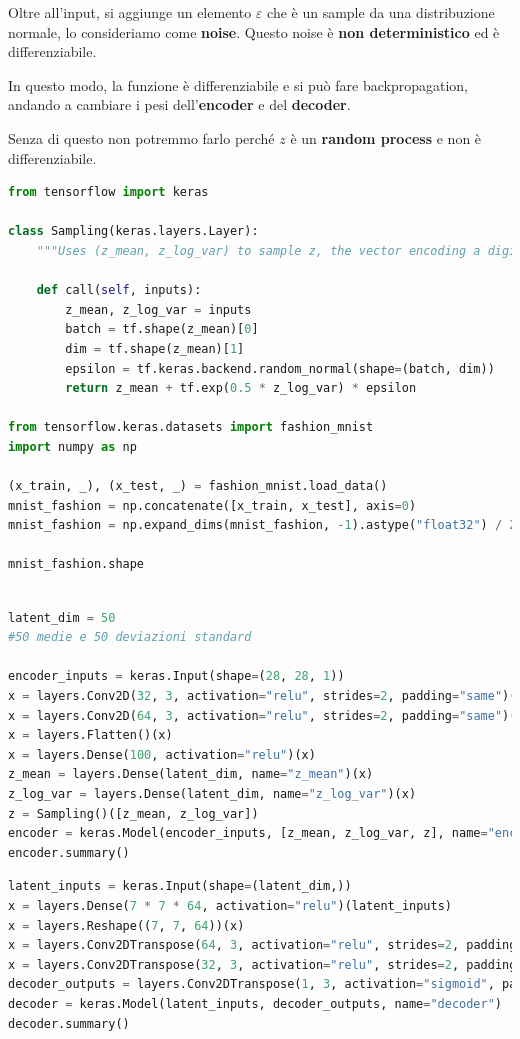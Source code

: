 Oltre all'input, si aggiunge un elemento $\varepsilon$ che è un sample da una
distribuzione normale, lo consideriamo come \textbf{noise}. Questo noise è
\textbf{non deterministico} ed è differenziabile.

In questo modo, la funzione è differenziabile e si può fare backpropagation,
andando a cambiare i pesi dell'\textbf{encoder} e del \textbf{decoder}.

Senza di questo non potremmo farlo perché $z$ è un \textbf{random process} e
non è differenziabile.

\begin{lstlisting}[language=Python, caption={Esempio di VAE}]
from tensorflow import keras 

class Sampling(keras.layers.Layer):
    """Uses (z_mean, z_log_var) to sample z, the vector encoding a digit."""

    def call(self, inputs):
        z_mean, z_log_var = inputs
        batch = tf.shape(z_mean)[0]
        dim = tf.shape(z_mean)[1]
        epsilon = tf.keras.backend.random_normal(shape=(batch, dim))
        return z_mean + tf.exp(0.5 * z_log_var) * epsilon

from tensorflow.keras.datasets import fashion_mnist
import numpy as np

(x_train, _), (x_test, _) = fashion_mnist.load_data()
mnist_fashion = np.concatenate([x_train, x_test], axis=0)
mnist_fashion = np.expand_dims(mnist_fashion, -1).astype("float32") / 255

mnist_fashion.shape
\end{lstlisting}

\begin{lstlisting}[language=Python, caption={Esempio di VAE}]
    
latent_dim = 50
#50 medie e 50 deviazioni standard

encoder_inputs = keras.Input(shape=(28, 28, 1))
x = layers.Conv2D(32, 3, activation="relu", strides=2, padding="same")(encoder_inputs)
x = layers.Conv2D(64, 3, activation="relu", strides=2, padding="same")(x)
x = layers.Flatten()(x)
x = layers.Dense(100, activation="relu")(x)
z_mean = layers.Dense(latent_dim, name="z_mean")(x)
z_log_var = layers.Dense(latent_dim, name="z_log_var")(x)
z = Sampling()([z_mean, z_log_var])
encoder = keras.Model(encoder_inputs, [z_mean, z_log_var, z], name="encoder")
encoder.summary()
\end{lstlisting}

\begin{lstlisting}[language=Python, caption={Esempio di VAE}]
latent_inputs = keras.Input(shape=(latent_dim,))
x = layers.Dense(7 * 7 * 64, activation="relu")(latent_inputs)
x = layers.Reshape((7, 7, 64))(x)
x = layers.Conv2DTranspose(64, 3, activation="relu", strides=2, padding="same")(x)
x = layers.Conv2DTranspose(32, 3, activation="relu", strides=2, padding="same")(x)
decoder_outputs = layers.Conv2DTranspose(1, 3, activation="sigmoid", padding="same")(x)
decoder = keras.Model(latent_inputs, decoder_outputs, name="decoder")
decoder.summary()
\end{lstlisting}

